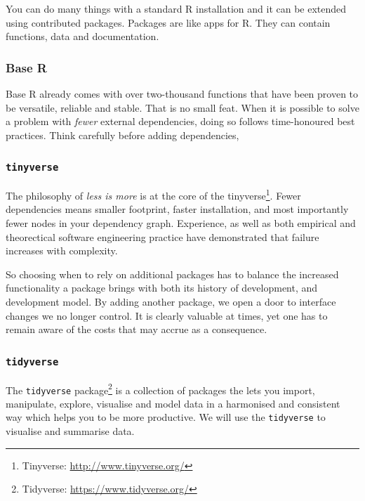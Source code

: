 \documentclass[letterpaperpaper,9pt,twocolumn,twoside,printwatermark=false]{pinp}
\begin{document}
You can do many things with a standard R installation and it can be
extended using contributed packages. Packages are like apps for R. They
can contain functions, data and documentation.

\hypertarget{base-r}{%
\subsubsection{Base R}\label{base-r}}

Base R already comes with over two-thousand functions that have been
proven to be versatile, reliable and stable. That is no small feat. When
it is possible to solve a problem with \emph{fewer} external
dependencies, doing so follows time-honoured best practices. Think
carefully before adding dependencies,

\hypertarget{tinyverse}{%
\subsubsection{\texorpdfstring{\texttt{tinyverse}}{tinyverse}}\label{tinyverse}}

The philosophy of \emph{less is more} is at the core of the
tinyverse\footnote{Tinyverse: \url{http://www.tinyverse.org/}}. Fewer
dependencies means smaller footprint, faster installation, and most
importantly fewer nodes in your dependency graph. Experience, as well as
both empirical and theorectical software engineering practice have
demonstrated that failure increases with complexity.

So choosing when to rely on additional packages has to balance the
increased functionality a package brings with both its history of
development, and development model. By adding another package, we open a
door to interface changes we no longer control. It is clearly valuable
at times, yet one has to remain aware of the costs that may accrue as a
consequence.

\hypertarget{tidyverse}{%
\subsubsection{\texorpdfstring{\texttt{tidyverse}}{tidyverse}}\label{tidyverse}}

The \texttt{tidyverse} package\footnote{Tidyverse:
  \url{https://www.tidyverse.org/}} is a collection of packages the lets
you import, manipulate, explore, visualise and model data in a
harmonised and consistent way which helps you to be more productive. We
will use the \texttt{tidyverse} to visualise and summarise data.
\end{document}
